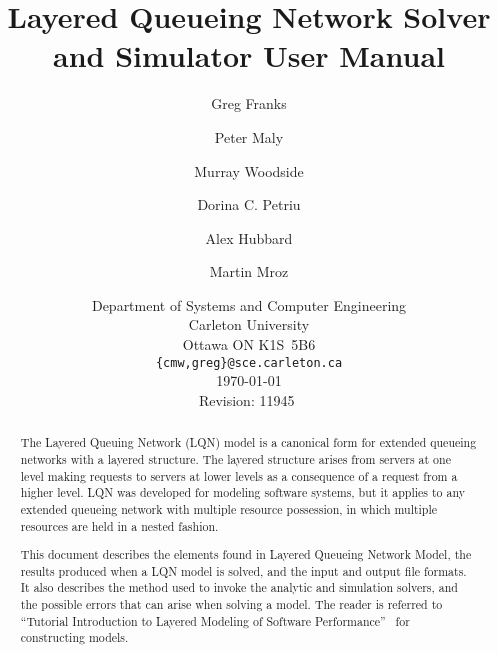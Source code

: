 \documentclass{report}
\begin{document}
\title{Layered Queueing Network Solver and Simulator User Manual}
\author{Greg Franks \and Peter Maly \and Murray Woodside \and Dorina
  C. Petriu \and Alex Hubbard \and Martin Mroz}
\date{Department of Systems and Computer Engineering\\
  Carleton University\\
  Ottawa ON K1S~5B6\\
  \texttt{\{cmw,greg\}@sce.carleton.ca}\\[1cm]
  \today\\[1cm]
  $\ $Revision: 11945 $\ $ } \maketitle \clearpage
\tableofcontents
\listoffigures
\listoftables
\clearpage
\begin{abstract}
  
The Layered Queuing Network (LQN) model is a canonical form for extended
queueing networks with a layered structure.
The layered structure arises from servers at one level making requests to servers at lower levels as a
consequence of a request from a higher level. LQN was developed for modeling software systems, but it
applies to any extended queueing network with multiple resource possession, in
which multiple resources are held in a nested fashion.

This document describes the elements found in Layered Queueing Network Model, the results produced when a
LQN model is solved, and the input and output file formats.  It also describes the method used to invoke the
analytic and simulation solvers, and the possible errors that can arise when solving a model.  The reader is
referred to ``Tutorial Introduction to Layered Modeling of Software Performance''~\cite{sw:woodside-xx} for
constructing models.
\end{abstract}










\appendix

\clearpage


%
\clearpage
\printindex
\end{document}
